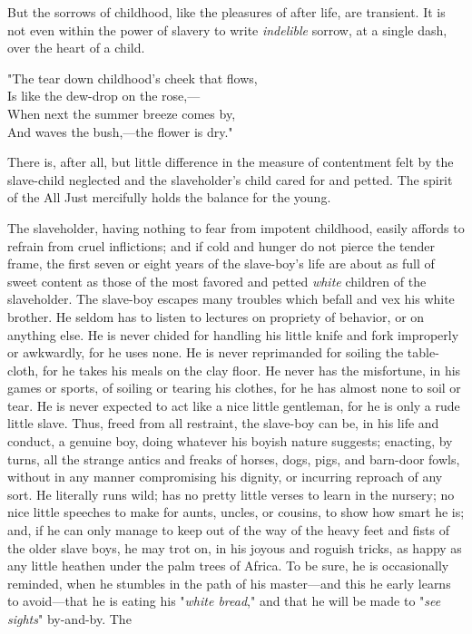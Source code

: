 But the sorrows of childhood, like the pleasures of after life, are
transient. It is not even within the power of slavery to write
\emph{indelible} sorrow, at a single dash, over the heart of a child.

{"}The tear down childhood's cheek that flows,\\
Is like the dew-drop on the rose,---\\
When next the summer breeze comes by,\\
And waves the bush,---the flower is dry."

There is, after all, but little difference in the measure of contentment
felt by the slave-child neglected and the slaveholder's child cared for
and petted. The spirit of the All Just mercifully holds the balance for
the young.

The slaveholder, having nothing to fear from impotent childhood, easily
affords to refrain from cruel inflictions; and if cold and hunger do not
pierce the tender frame, the first seven or eight years of the
slave-boy's life are about as full of sweet content as those of the most
favored and petted \emph{white} children of the slaveholder. The
slave-boy escapes many troubles which befall and vex his white brother.
He seldom has to listen to lectures on propriety of
{\protect\hypertarget{41}{}{}}behavior, or on anything else. He is never
chided for handling his little knife and fork improperly or awkwardly,
for he uses none. He is never reprimanded for soiling the table-cloth,
for he takes his meals on the clay floor. He never has the misfortune,
in his games or sports, of soiling or tearing his clothes, for he has
almost none to soil or tear. He is never expected to act like a nice
little gentleman, for he is only a rude little slave. Thus, freed from
all restraint, the slave-boy can be, in his life and conduct, a genuine
boy, doing whatever his boyish nature suggests; enacting, by turns, all
the strange antics and freaks of horses, dogs, pigs, and barn-door
fowls, without in any manner compromising his dignity, or incurring
reproach of any sort. He literally runs wild; has no pretty little
verses to learn in the nursery; no nice little speeches to make for
aunts, uncles, or cousins, to show how smart he is; and, if he can only
manage to keep out of the way of the heavy feet and fists of the older
slave boys, he may trot on, in his joyous and roguish tricks, as happy
as any little heathen under the palm trees of Africa. To be sure, he is
occasionally reminded, when he stumbles in the path of his master---and
this he early learns to avoid---that he is eating his "\emph{white
bread}," and that he will be made to "\emph{see sights}" by-and-by. The
